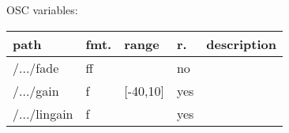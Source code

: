 \begin{snugshade}
{\footnotesize
\label{osctab:tascarapgain}
OSC variables:
\nopagebreak

\begin{tabularx}{\textwidth}{llllX}
\hline
path & fmt. & range & r. & description\\
\hline
/.../fade & ff &  & no & \\
/.../gain & f & [-40,10] & yes & \\
/.../lingain & f &  & yes & \\
\hline
\end{tabularx}
}
\end{snugshade}
